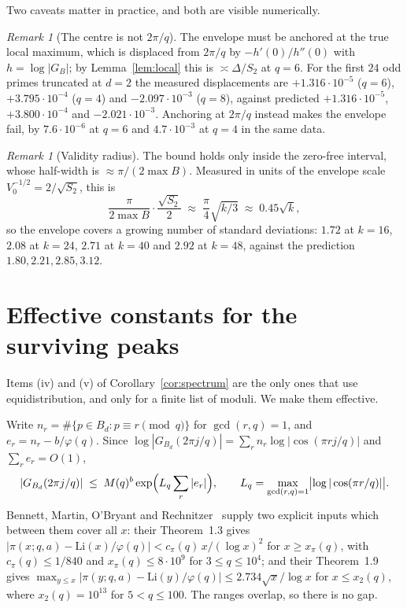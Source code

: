 \documentclass[11pt,a4paper]{article}
\theoremstyle{plain}
\theoremstyle{definition}
\theoremstyle{remark}
\newtheorem{remark}[theorem]{Remark}
\begin{document}
Two caveats matter in practice, and both are visible numerically.

\begin{remark}[The centre is not $2\pi/q$]\label{rem:centre}
The envelope must be anchored at the true local maximum, which is displaced from
$2\pi/q$ by $-h'(0)/h''(0)$ with $h=\log|G_B|$; by Lemma~\ref{lem:local} this is
$\asymp\Delta/S_2$ at $q=6$. For the first $24$ odd primes truncated at $d=2$
the measured displacements are $+1.316\cdot10^{-5}$ ($q=6$),
$+3.795\cdot10^{-4}$ ($q=4$) and $-2.097\cdot10^{-3}$ ($q=8$), against predicted
$+1.316\cdot10^{-5}$, $+3.800\cdot10^{-4}$ and $-2.021\cdot10^{-3}$. Anchoring
at $2\pi/q$ instead makes the envelope fail, by $7.6\cdot10^{-6}$ at $q=6$ and
$4.7\cdot10^{-3}$ at $q=4$ in the same data.
\end{remark}

\begin{remark}[Validity radius]\label{rem:radius}
The bound holds only inside the zero-free interval, whose half-width is
$\approx\pi/(2\max B)$. Measured in units of the envelope scale
$V_0^{-1/2}=2/\sqrt{S_2}$, this is
\[
  \frac{\pi}{2\max B}\cdot\frac{\sqrt{S_2}}{2}\;\approx\;\frac{\pi}{4}\sqrt{k/3}
  \;\approx\;0.45\sqrt{k},
\]
so the envelope covers a growing number of standard deviations: $1.72$ at
$k=16$, $2.08$ at $k=24$, $2.71$ at $k=40$ and $2.92$ at $k=48$, against the
prediction $1.80,2.21,2.85,3.12$.
\end{remark}

\section{Effective constants for the surviving peaks}\label{sec:l5a}

Items (iv) and (v) of Corollary~\ref{cor:spectrum} are the only ones that use
equidistribution, and only for a finite list of moduli. We make them effective.

Write $n_r=\#\{p\in B_d:p\equiv r\pmod q\}$ for $\gcd(r,q)=1$, and
$e_r=n_r-b/\varphi(q)$. Since
$\log|G_{B_d}(2\pi j/q)|=\sum_r n_r\log|\cos(\pi rj/q)|$ and
$\sum_r e_r=O(1)$,
\[
  |G_{B_d}(2\pi j/q)|\;\le\;M(q)^{b}\exp\Bigl(L_q\sum_r|e_r|\Bigr),
  \qquad
  L_q=\max_{\gcd(r,q)=1}\bigl|\log|\cos(\pi r/q)|\bigr| .
\]
Bennett, Martin, O'Bryant and Rechnitzer~\cite{BMOR18} supply two explicit
inputs which between them cover all $x$: their Theorem~1.3 gives
$|\pi(x;q,a)-\mathrm{Li}(x)/\varphi(q)|<c_\pi(q)\,x/(\log x)^{2}$ for
$x\ge x_\pi(q)$, with $c_\pi(q)\le1/840$ and $x_\pi(q)\le8\cdot10^{9}$ for
$3\le q\le10^{4}$; and their Theorem~1.9 gives
$\max_{y\le x}|\pi(y;q,a)-\mathrm{Li}(y)/\varphi(q)|\le2.734\sqrt{x}/\log x$ for
$x\le x_2(q)$, where $x_2(q)=10^{13}$ for $5<q\le100$. The ranges overlap, so
there is no gap.
\end{document}
